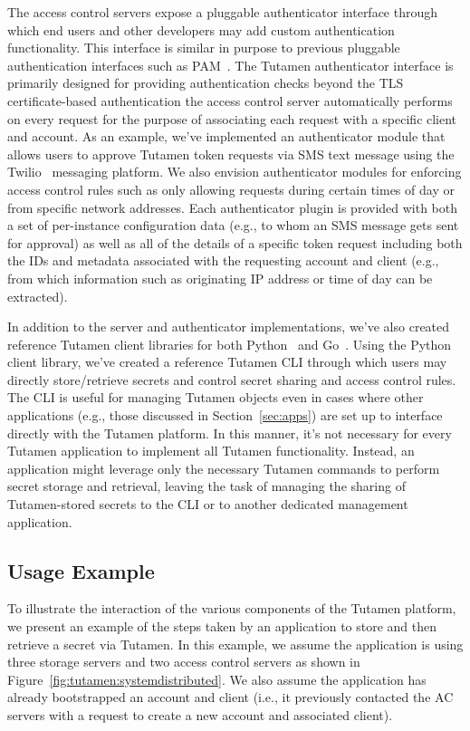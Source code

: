 The access control servers expose a pluggable authenticator interface
through which end users and other developers may add custom
authentication functionality. This interface is similar in purpose to
previous pluggable authentication interfaces such as
PAM~\cite{samar1996}. The Tutamen authenticator interface is primarily
designed for providing authentication checks beyond the TLS
certificate-based authentication the access control server
automatically performs on every request for the purpose of associating
each request with a specific client and account. As an example, we've
implemented an authenticator module that allows users to approve
Tutamen token requests via SMS text message using the
Twilio~\cite{twilio} messaging platform. We also envision
authenticator modules for enforcing access control rules such as only
allowing requests during certain times of day or from specific network
addresses. Each authenticator plugin is provided with both a set of
per-instance configuration data (e.g., to whom an SMS message gets sent
for approval) as well as all of the details of a specific token
request including both the IDs and metadata associated with the
requesting account and client (e.g., from which information such as
originating IP address or time of day can be extracted).

In addition to the server and authenticator implementations, we've
also created reference Tutamen client libraries for both
Python~\cite{src-tutamen-pytutamen} and
Go~\cite{src-tutamen-go}. Using the Python client library, we've
created a reference Tutamen CLI through which users may directly
store/retrieve secrets and control secret sharing and access control
rules. The CLI is useful for managing Tutamen objects even in cases
where other applications (e.g., those discussed in
Section~\ref{sec:apps}) are set up to interface directly with the
Tutamen platform. In this manner, it's not necessary for every Tutamen
application to implement all Tutamen functionality. Instead, an
application might leverage only the necessary Tutamen commands to
perform secret storage and retrieval, leaving the task of managing the
sharing of Tutamen-stored secrets to the CLI or to another dedicated
management application.

\subsection{Usage Example}

To illustrate the interaction of the various components of the Tutamen
platform, we present an example of the steps taken by an application
to store and then retrieve a secret via Tutamen. In this example, we
assume the application is using three storage servers and two access
control servers as shown in
Figure~\ref{fig:tutamen:systemdistributed}. We also assume the
application has already bootstrapped an account and client (i.e., it
previously contacted the AC servers with a request to create a new
account and associated client).


